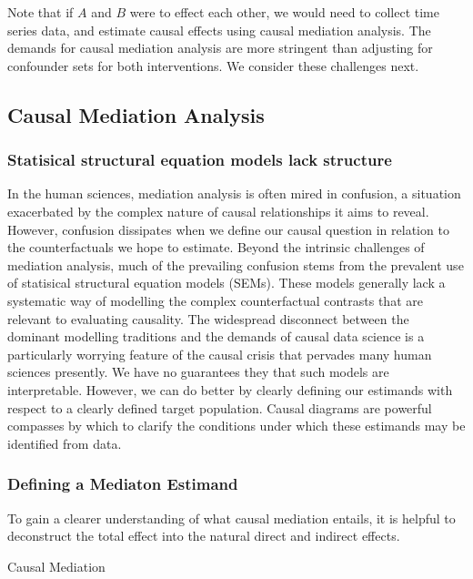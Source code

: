 \documentclass[
  single column]{article}
\begin{document}
Note that if \(A\) and \(B\) were to effect each other, we would need to
collect time series data, and estimate causal effects using causal
mediation analysis. The demands for causal mediation analysis are more
stringent than adjusting for confounder sets for both interventions. We
consider these challenges next.

\subsection{Causal Mediation Analysis}\label{causal-mediation-analysis}

\subsubsection{Statisical structural equation models lack
structure}\label{statisical-structural-equation-models-lack-structure}

In the human sciences, mediation analysis is often mired in confusion, a
situation exacerbated by the complex nature of causal relationships it
aims to reveal. However, confusion dissipates when we define our causal
question in relation to the counterfactuals we hope to estimate. Beyond
the intrinsic challenges of mediation analysis, much of the prevailing
confusion stems from the prevalent use of statisical structural equation
models (SEMs). These models generally lack a systematic way of modelling
the complex counterfactual contrasts that are relevant to evaluating
causality. The widespread disconnect between the dominant modelling
traditions and the demands of causal data science is a particularly
worrying feature of the causal crisis that pervades many human sciences
presently. We have no guarantees they that such models are
interpretable. However, we can do better by clearly defining our
estimands with respect to a clearly defined target population. Causal
diagrams are powerful compasses by which to clarify the conditions under
which these estimands may be identified from data.

\subsubsection{Defining a Mediaton
Estimand}\label{defining-a-mediaton-estimand}

To gain a clearer understanding of what causal mediation entails, it is
helpful to deconstruct the total effect into the natural direct and
indirect effects.

\begin{table}

\caption{\label{tbl-medationpuzzle}Causal Mediation}

\centering{

\mediationpuzzle

}

\end{table}%
\end{document}

